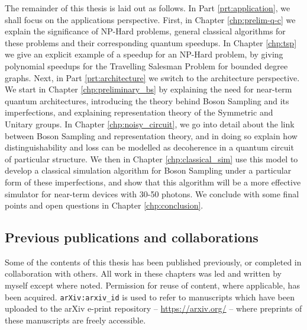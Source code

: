 The remainder of this thesis is laid out as follows. In Part \ref{prt:application}, we shall focus on the applications perspective. First, in Chapter \ref{chp:prelim-q-c} we explain the significance of NP-Hard problems, general classical algorithms for these problems and their corresponding quantum speedups. In Chapter \ref{chp:tsp} we give an explicit example of a speedup for an NP-Hard problem, by giving polynomial speedups for the Travelling Salesman Problem for bounded degree graphs. Next, in Part \ref{prt:architecture} we switch to the architecture perspective. We start in Chapter \ref{chp:preliminary_bs} by explaining the need for near-term quantum architectures, introducing the theory behind Boson Sampling and its imperfections, and explaining representation theory of the Symmetric and Unitary groups. In Chapter \ref{chp:noisy_circuit}, we go into detail about the link between Boson Sampling and representation theory, and in doing so explain how distinguishability and loss can be modelled as decoherence in a quantum circuit of particular structure. We then in Chapter \ref{chp:classical_sim} use this model to develop a classical simulation algorithm for Boson Sampling under a particular form of these imperfections, and show that this algorithm will be a more effective simulator for near-term devices with 30-50 photons. We conclude with some final points and open questions in Chapter \ref{chp:conclusion}.

\subsection{Previous publications and collaborations}

Some of the contents of this thesis has been published previously, or completed in collaboration with others. All work in these chapters was led and written by myself except where noted. Permission for reuse of content, where applicable, has been acquired. {\tt arXiv:arxiv\_id} is used to refer to manuscripts which have been uploaded to the arXiv e-print repository -- \url{https://arxiv.org/} -- where preprints of these manuscripts are freely accessible.

